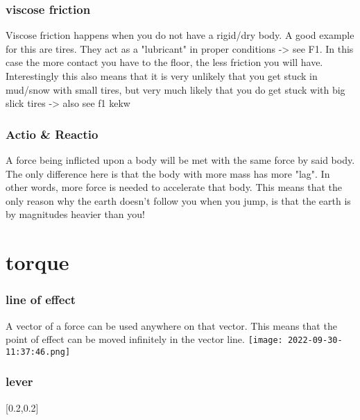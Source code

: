 \documentclass[main.tex,fontsize=8pt,paper=a4,paper=portrait,DIV=calc,]{scrartcl}
\begin{document}
\begin{multicols*}{2}
\subsubsection{viscose friction}
Viscose friction happens when you do not have a rigid/dry body.\newline
A good example for this are tires. They act as a "lubricant" in proper conditions -> see F1.\newline
In this case the more contact you have to the floor, the less friction you will have.\newline
Interestingly this also means that it is very unlikely that you get stuck in mud/snow with small tires,\newline
but very much likely that you do get stuck with big slick tires -> also see f1 kekw

\subsubsection{Actio \& Reactio}
A force being inflicted upon a body will be met with the same force by said body.\newline
The only difference here is that the body with more mass has more "lag". \newline
In other words, more force is needed to accelerate that body.\newline
This means that the only reason why the earth doesn't follow you when you jump,\newline
is that the earth is by magnitudes heavier than you!\newline
{}

\section{torque}
\subsubsection{line of effect}
A vector of a force can be used anywhere on that vector.\newline
This means that the point of effect can be moved infinitely in the vector line.\newline
\texttt{[image: 2022-09-30-11:37:46.png]}

\subsubsection{lever} 
[0.2,0.2]


\end{multicols*}
\end{document}

